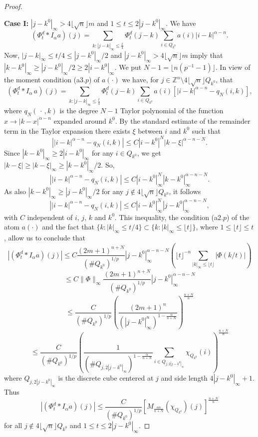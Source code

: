 \documentclass[leqno,12pt]{article} %
\theoremstyle{plain} %
\theoremstyle{definition} %
\begin{document}
\begin{proof}
\

{\bf Case I:} $|j - k^0 |_{\infty} > 4 \lfloor \sqrt{n} \rfloor m$ and $1 \leq t \leq 2 |j - k^0 |_{\infty}$. We have
\[
(\Phi_t^d \ast I_{\alpha}a)(j) = \sum_{k : |j-k|_{\infty} \leq \frac{t}{4}} \Phi^{d}_{t}(j-k) \sum_{i \in Q_{k^0}} a(i) |i-k|^{\alpha-n}.
\]
Now, $|j-k|_{\infty} \leq t/4 \leq |j-k^0|_{\infty}/2$ and $|j - k^0 |_{\infty} > 4 \lfloor \sqrt{n} \rfloor m$ imply that 
$|k - k^0 |_{\infty} \geq |j - k^0 |_{\infty}/2 \geq 2|i - k^0 |_{\infty}$. We put $N - 1 = \lfloor n(p^{-1} - 1) \rfloor$. In view of the moment condition (a3.$p$) of $a(\cdot)$ we have, for $j \in \mathbb{Z}^n \setminus 4 \lfloor \sqrt{n} \rfloor Q_{k^0}$, that
\[
(\Phi_{t}^{d} \ast I_{\alpha} \, a)(j) = \sum_{k : |j-k|_{\infty} \leq \frac{t}{4}} \Phi^{d}_{t}(j-k) \sum_{i \in Q_{k^0}} a(i) 
\left[|i-k|^{\alpha-n} - q_{N}(i,k) \right],
\]
where $q_{N}(\, \cdot \,, k)$ is the degree $N - 1$ Taylor polynomial of the function $x \rightarrow |k - x|^{\alpha-n}$ expanded around 
$k^0$. By the standard estimate of the remainder term in the Taylor expansion there exists $\xi$ between $i$ and $k^0$ such that
\[
\left| |i-k|^{\alpha-n} - q_{N}(i,k) \right| \leq C |i - k^0 |^{N} |k - \xi|^{\alpha-n-N}.
\]
Since $|k - k^0 |_{\infty} \geq 2|i - k^0 |_{\infty}$ for any $i \in Q_{k^0}$, we get 
$|k - \xi| \geq |k - \xi|_{\infty} \geq |k - k^0|_{\infty}/2$. So,
\[
\left| |i-k|^{\alpha-n} - q_{N}(i,k) \right| \leq C |i - k^0 |^{N}_{\infty} |k - k^0|^{\alpha-n-N}_{\infty}.
\]
As also $|k - k^0 |_{\infty} \geq |j - k^0 |_{\infty}/2$ for any $j \notin 4\lfloor \sqrt{n} \rfloor Q_{k^0}$, it follows
\[
\left| |i-k|^{\alpha-n} - q_{N}(i,k) \right| \leq C |i - k^0 |^{N}_{\infty} |j - k^0|^{\alpha-n-N}_{\infty},
\]
with $C$ independent of $i$, $j$, $k$ and $k^0$. This inequality, the condition (a2.$p$) of the atom $a(\cdot)$ and the fact that 
$\{ k : |k|_{\infty} \leq t/4 \} \subset \{ k : |k|_{\infty} \leq \lfloor t \rfloor \}$, where $1 \leq \lfloor t \rfloor \leq t$, allow us to conclude that
\[
|(\Phi^{d}_{t} \ast I_{\alpha}a)(j)| \leq C \frac{(2m+1)^{n+N}}{(\# Q_{k^0})^{1/p}} | j - k^0|^{\alpha-n-N}_{\infty} 
\left( \lfloor t \rfloor^{-n} \sum_{|k|_{\infty} \leq \lfloor t \rfloor} |\Phi(k/t)| \right)
\]
\[
\leq C \| \Phi \|_{\infty} \frac{(2m+1)^{n+N}}{(\# Q_{k^0})^{1/p}} | j - k^0|^{\alpha-n-N}_{\infty}
\]
\[
\leq \frac{C}{(\# Q_{k^0})^{1/p}} \left( \frac{(2m+1)^n}{(| j - k^0|_{\infty}^{n})^{1-\frac{\alpha}{n+N}}} \right)^{\frac{n+N}{n}}
\]
\[
\leq \frac{C}{(\# Q_{k^0})^{1/p}} \left( \frac{1}{(\# Q_{j, 2| j - k^0|_{\infty}})^{1-\frac{\alpha}{n+N}}} 
\sum_{i \in Q_{j, 2| j - k^0|_{\infty}}} \chi_{Q_{k^0}}(i) \right)^{\frac{n+N}{n}}
\]
where $Q_{j, 2| j - k^0|_{\infty}}$ is the discrete cube centered at $j$ and side length $4| j - k^0|_{\infty} + 1$. Thus
\[
|(\Phi^{d}_{t} \ast I_{\alpha}a)(j)| \leq \frac{C}{(\# Q_{k^0})^{1/p}} 
\left[ M_{\frac{\alpha n}{n+N}} (\chi_{Q_{k^0}})(j) \right]^{\frac{n+N}{n}}
\]
for all $j \notin 4 \lfloor \sqrt{n} \rfloor Q_{k^0}$ and $1 \leq t \leq 2 |j - k^0 |_{\infty}$. 


\end{proof}
\end{document}
